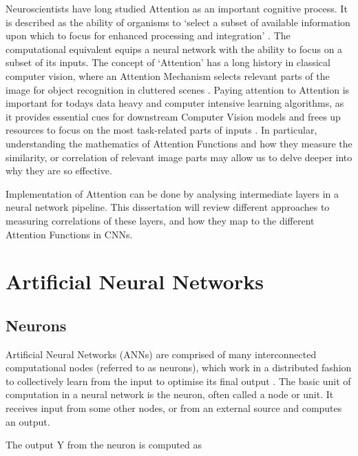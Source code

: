 \documentclass[11pt]{article}
\begin{document}
Neuroscientists have long studied Attention as an important cognitive process. It is described as the ability of organisms to ‘select a subset of available information upon which to focus for enhanced processing and integration’ \cite{scholar}. The computational equivalent equips a neural network with the ability to focus on a subset of its inputs. The concept of ‘Attention’ has a long history in classical computer vision, where an Attention Mechanism selects relevant parts of the image for object recognition in cluttered scenes \cite{walther}. Paying attention to Attention is important for todays data heavy and computer intensive learning algorithms, as it provides essential cues for downstream Computer Vision models and frees up resources to focus on the most task-related parts of inputs \cite{borji}. In particular, understanding the mathematics of Attention Functions and how they measure the similarity, or correlation of relevant image parts may allow us to delve deeper into why they are so effective.\newline

Implementation of Attention can be done by analysing intermediate layers in a neural network pipeline. This dissertation will review different approaches to measuring correlations of these layers, and how they map to the different Attention Functions in CNNs.


\section{Artificial Neural Networks}
\subsection{Neurons}

Artificial Neural Networks (ANNs) are comprised of many interconnected computational nodes (referred to as neurons), which work in a distributed fashion to collectively learn from the input to optimise its final output \cite{chen}\cite{walczaka}. The basic unit of computation in a neural network is the neuron, often called a node or unit. It receives input from some other nodes, or from an external source and computes an output. \newline

The output Y from the neuron is computed as
\end{document}
